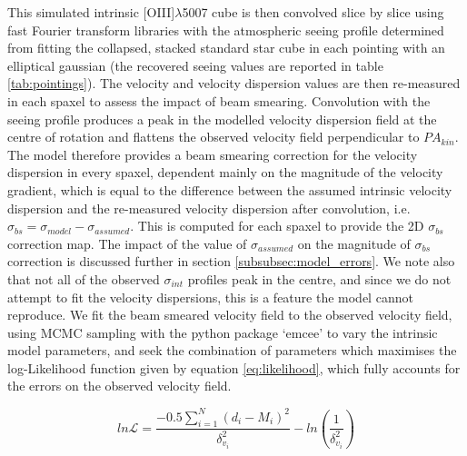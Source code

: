 \documentclass[fleqn,usenatbib]{mn2e}
\newcommand{\Lagr}{\mathcal{L}}
\begin{document}
This simulated intrinsic [OIII]$\lambda$5007 cube is then convolved slice by slice using fast Fourier transform libraries with the atmospheric seeing profile determined from fitting the collapsed, stacked standard star cube in each pointing with an elliptical gaussian (the recovered seeing values are reported in table \ref{tab:pointings}).
The velocity and velocity dispersion values are then re-measured in each spaxel to assess the impact of beam smearing.
Convolution with the seeing profile produces a peak in the modelled velocity dispersion field at the centre of rotation and flattens the observed velocity field perpendicular to $PA_{kin}$.
The model therefore provides a beam smearing correction for the velocity dispersion in every spaxel, dependent mainly on the magnitude of the velocity gradient, which is equal to the difference between the assumed intrinsic velocity dispersion and the re-measured velocity dispersion after convolution, i.e. $\sigma_{bs} = \sigma_{model} - \sigma_{assumed}$.
This is computed for each spaxel to provide the 2D $\sigma_{bs}$ correction map.
The impact of the value of $\sigma_{assumed}$ on the magnitude of $\sigma_{bs}$ correction is discussed further in section \cref{subsubsec:model_errors}.
We note also that not all of the observed $\sigma_{int}$ profiles peak in the centre, and since we do not attempt to fit the velocity dispersions, this is a feature the model cannot reproduce. 
We fit the beam smeared velocity field to the observed velocity field, using MCMC sampling with the python package `emcee' \citep{Foreman-Mackey2013} to vary the intrinsic model parameters, and seek the combination of parameters which maximises the log-Likelihood function given by equation \ref{eq:likelihood}, which fully accounts for the errors on the observed velocity field.

\begin{equation}\label{eq:likelihood}
   ln\Lagr = \frac{-0.5\sum_{i=1}^{N}(d_{i} - M_{i})^{2}}{\delta_{v_{i}}^{2}} - ln\left(\frac{1}{\delta_{v_{i}}^{2}}\right)
\end{equation}
\end{document}
